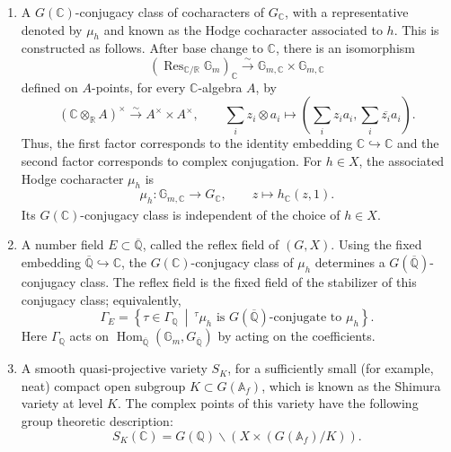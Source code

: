\documentclass[11pt,a4paper]{article}
\theoremstyle{definition}
\theoremstyle{plain}
\theoremstyle{remark}
\theoremstyle{plain}
\DeclareMathOperator{\Hom}{Hom}
\DeclareMathOperator{\Res}{Res}
\begin{document}
\begin{enumerate}
    \item A $G(\mathbb{C})$-conjugacy class of cocharacters of $G_{\mathbb{C}}$, with a representative denoted by $\mu_h$ and known as the Hodge cocharacter associated to $h$. This is constructed as follows. After base change to $\mathbb{C}$, there is an isomorphism
    $$
        \left(\Res_{\mathbb{C}/\mathbb{R}}\mathbb{G}_m\right)_{\mathbb{C}}
        \xrightarrow[]{\sim}
        \mathbb{G}_{m,\mathbb{C}}\times\mathbb{G}_{m,\mathbb{C}}
    $$
    defined on $A$-points, for every $\mathbb{C}$-algebra $A$, by
    $$
        \left(\mathbb{C}\otimes_{\mathbb{R}}A\right)^{\times}
        \xrightarrow[]{\sim}
        A^{\times}\times A^{\times},
        \qquad
        \sum_i z_i\otimes a_i
        \longmapsto
        \left(
            \sum_i z_i a_i,
            \sum_i \overline{z_i}a_i
        \right).
    $$
    Thus, the first factor corresponds to the identity embedding
    $\mathbb{C}\hookrightarrow\mathbb{C}$ and the second factor corresponds to complex conjugation. For $h\in X$, the associated Hodge cocharacter $\mu_h$ is
    $$
        \mu_h:\mathbb{G}_{m,\mathbb{C}}
        \xrightarrow[]{}
        G_{\mathbb{C}},
        \qquad
        z\longmapsto h_{\mathbb{C}}(z,1).
    $$
    Its $G(\mathbb{C})$-conjugacy class is independent of the choice of $h\in X$.

    \item A number field $E\subset\overline{\mathbb{Q}}$, called the reflex field of $(G,X)$. Using the fixed embedding $\overline{\mathbb{Q}}\hookrightarrow\mathbb{C}$, the $G(\mathbb{C})$-conjugacy class of $\mu_h$ determines a $G(\overline{\mathbb{Q}})$-conjugacy class. The reflex field is the fixed field of the stabilizer of this conjugacy class; equivalently,
    $$
        \Gamma_E
        =
        \left\{
            \tau\in \Gamma_{\mathbb{Q}}
            \ \middle|\
            {}^{\tau}\mu_h
            \text{ is }G(\overline{\mathbb{Q}})\text{-conjugate to }\mu_h
        \right\}.
    $$
    Here $\Gamma_{\mathbb{Q}}$ acts on $\Hom_{\overline{\mathbb{Q}}}(\mathbb{G}_m,G_{\overline{\mathbb{Q}}})$ by acting on the coefficients.
    \item A smooth quasi-projective variety $S_K$, for a sufficiently small (for example, neat) compact open subgroup $K\subset G(\mathbb{A}_f)$, which is known as the Shimura variety at level $K$. The complex points of this variety have the following group theoretic description:
    $$S_K(\mathbb{C}) = G(\mathbb{Q})\backslash(X \times (G(\mathbb{A}_f) / K)).$$
\end{enumerate}
\end{document}
